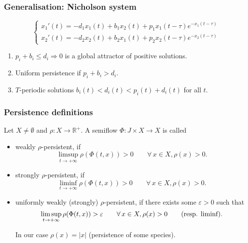 \documentclass[spanish]{beamer}
\newcommand{\R}{{\mathbb{R}}}
\def \le{\leqslant}
\begin{document}
\begin{frame}
\frametitle{Generalisation: Nicholson system}

\begin{equation}
    \label{nich-sys}
    \left\{\begin{array}{c}
        x_1'(t)=-d_1 x_1(t) + b_1x_2(t)+ p_1 x_1(t-\tau)e^{-x_1(t-\tau)}    \\
               x_2'(t)=-d_2 x_2(t) + b_2x_1(t)+ p_2 x_2(t-\tau)e^{-x_2(t-\tau)}  
    \end{array}
    \right.
    \end{equation}

\begin{enumerate}
    \item $p_i+b_i\le d_i\Longrightarrow 0$ is a global attractor of positive solutions. 
        \item Uniform persistence if $p_i+b_i>d_i$.
        
        \item $T$-periodic solutions $b_i(t)<d_i(t) <p_i(t)+d_i(t)$ for all $t$. 
        
    
\end{enumerate}
\end{frame}




\begin{frame}

\frametitle{Persistence definitions}

Let $X\ne \emptyset$ and 
$\rho: X \to \R^+$. A semiflow $\Phi : J \times X \to  X$ is called 



\begin{itemize}
    \item weakly $\rho$-persistent, if
$$\limsup_{t\to+\infty}  
\rho(\Phi(t, x)) > 0\qquad \forall\, x \in  X, \rho(x) > 0.$$
    
    \item 
     strongly $\rho$-persistent, if
$$\liminf_{t\to+\infty}  
\rho(\Phi(t, x)) > 0\qquad \forall\, x \in  X, \rho(x) > 0.$$
\item 
uniformly weakly (strongly) $\rho$-persistent, if
there exists some  $\varepsilon > 0$ such that
$$\limsup_{t\to+\infty}  
\rho(\Phi(t, x)) > \varepsilon \qquad \forall\, x \in  X, \rho(x) > 0\qquad \hbox{(resp. liminf)}.$$
 

\medskip
In our case 
$\rho(x) = |x|$ (persistence of some  species).

\end{itemize}

\end{frame}
\end{document}
